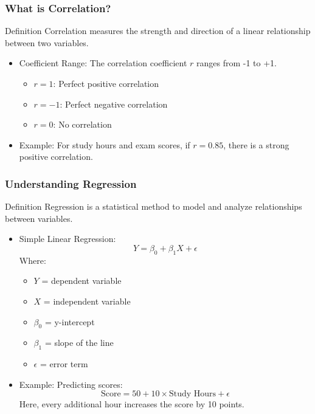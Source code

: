 \documentclass[aspectratio=169]{beamer}
\begin{document}
\begin{frame}[fragile]
    \frametitle{What is Correlation?}
    \begin{block}{Definition}
        Correlation measures the strength and direction of a linear relationship between two variables.
    \end{block}
    \begin{itemize}
        \item Coefficient Range: The correlation coefficient \( r \) ranges from -1 to +1.
        \begin{itemize}
            \item \( r = 1 \): Perfect positive correlation
            \item \( r = -1 \): Perfect negative correlation
            \item \( r = 0 \): No correlation
        \end{itemize}
        \item Example: For study hours and exam scores, if \( r = 0.85 \), there is a strong positive correlation.
    \end{itemize}
\end{frame}

\begin{frame}[fragile]
    \frametitle{Understanding Regression}
    \begin{block}{Definition}
        Regression is a statistical method to model and analyze relationships between variables.
    \end{block}
    \begin{itemize}
        \item Simple Linear Regression: 
        \begin{equation}
            Y = \beta_0 + \beta_1 X + \epsilon
        \end{equation}
        Where:
        \begin{itemize}
            \item \( Y \) = dependent variable
            \item \( X \) = independent variable
            \item \( \beta_0 \) = y-intercept
            \item \( \beta_1 \) = slope of the line
            \item \( \epsilon \) = error term
        \end{itemize}
        \item Example: Predicting scores:
        \begin{equation}
            \text{Score} = 50 + 10 \times \text{Study Hours} + \epsilon
        \end{equation}
        Here, every additional hour increases the score by 10 points.
    \end{itemize}
\end{frame}
\end{document}
